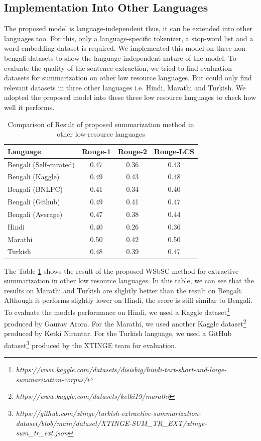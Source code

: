 \documentclass[acmlarge]{acmart}
\begin{document}
\subsection{Implementation Into Other Languages}\label{subsec:implementation-into-other-languages}
The proposed model is language-independent thus, it can be extended into other languages too. For this, only a language-specific tokenizer, a stop-word list and a word embedding dataset is required. We implemented this model on three non-bengali datasets to show the language independent nature of the model. To evaluate the quality of the sentence extraction, we tried to find evaluation datasets for summarization on other low resource languages. But could only find relevant datasets in three other languages i.e. Hindi, Marathi and Turkish. We adopted the proposed model into these three low resource languages to check how well it performs.
\begin{table}[]
	\centering
	\begin{tabular}{lccc}\hline
		Language              	& Rouge-1   & Rouge-2   & Rouge-LCS \\\hline
		Bengali (Self-curated)	& 0.47      & 0.36      & 0.43      \\
		Bengali (Kaggle)   		& 0.49      & 0.43      & 0.48      \\
		Bengali (BNLPC)   		& 0.41      & 0.34      & 0.40      \\
		Bengali (Github)   		& 0.49      & 0.41      & 0.47      \\
		Bengali (Average)       & 0.47      & 0.38      & 0.44      \\\hline
		Hindi                   & 0.40      & 0.26      & 0.36      \\\hline
		Marathi                 & 0.50	    & 0.42      & 0.50      \\\hline
		Turkish                 & 0.48      & 0.39      & 0.47      \\\hline
	\end{tabular}
	\caption{Comparison of Result of proposed summarization method in other low-resource languages}
	\label{tab:other_language}
\end{table}

The Table \ref{tab:other_language} shows the result of the proposed WSbSC method for extractive summarization in other low resource languages. In this table, we can see that the results on Marathi and Turkish are slightly better than the result on Bengali. Although it performs slightly lower on Hindi, the score is still similar to Bengali. To evaluate the models performance on Hindi, we used a Kaggle dataset\footnote{\textit{https://www.kaggle.com/datasets/disisbig/hindi-text-short-and-large-summarization-corpus/}} produced by Gaurav Arora. For the Marathi, we used another Kaggle dataset\footnote{\textit{https://www.kaggle.com/datasets/ketki19/marathi}} produced by Ketki Nirantar. For the Turkish language, we used a GitHub dataset\footnote{\textit{https://github.com/xtinge/turkish-extractive-summarization-dataset/blob/main/dataset/XTINGE-SUM\_TR\_EXT/xtinge-sum\_tr\_ext.json}} produced by the XTINGE \cite{Demir-2024-xtinge_turkish_extractive} team for evaluation. 
\end{document}
